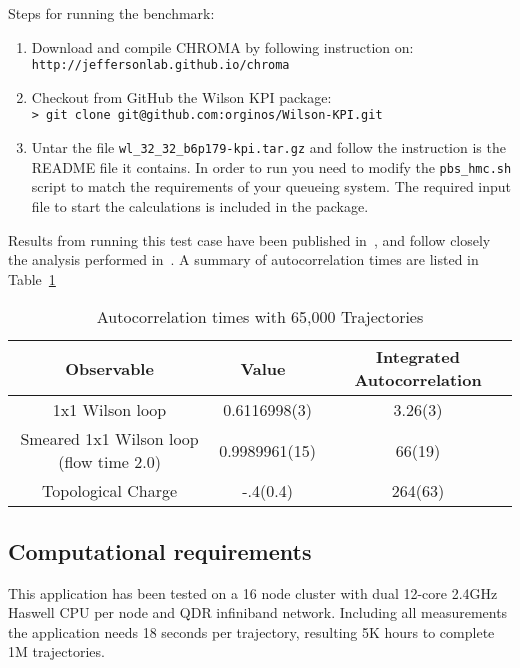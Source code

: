 \documentclass[11pt,a4paper]{article}
\begin{document}
\noindent
Steps for running the benchmark:
\begin{enumerate}
\item	 Download and compile CHROMA by following instruction on:\\
{\tt http://jeffersonlab.github.io/chroma }
\item Checkout from GitHub the Wilson KPI package:\\
	{\tt > git clone git@github.com:orginos/Wilson-KPI.git}
\item Untar the file {\tt wl\_32\_32\_b6p179-kpi.tar.gz} and follow the instruction is the README file it contains. In order to run you need to modify the {\tt pbs\_hmc.sh} script to match the requirements of your queueing system. The required input file to start the calculations is included in the package.
\end{enumerate}

Results from running this test case have been published in~\cite{Gambhir:2015nda},
and follow closely the analysis performed in~\cite{Schaefer:2010hu}. A summary of autocorrelation times are listed in Table~\ref{tab:auto}
\begin{table}[!ht]
\caption{\label{tab:auto}Autocorrelation times with 65,000 Trajectories} %
{\centering  
\begin{tabular}{c c c} 
\hline\hline %
Observable & Value\ & Integrated Autocorrelation \\ [0.5ex] %
\hline %
 1x1 Wilson loop &  0.6116998(3) & 3.26(3) \\
Smeared 1x1 Wilson loop (flow time 2.0)  &  0.9989961(15) & 66(19) \\  
Topological Charge &-.4(0.4) & 264(63) \\ 
\hline %
\end{tabular} 
}
\end{table}



\subsection{Computational requirements}
 This application has been tested on a 16 node cluster with dual 12-core 2.4GHz Haswell CPU per node and QDR infiniband network. Including all measurements the application needs 18 seconds per trajectory, resulting 5K hours to complete 1M trajectories.
 



\end{document}
